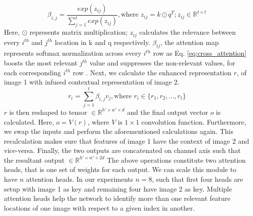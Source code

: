 \documentclass[a4paper,conference]{IEEEtran}
\begin{document}
\begin{equation}
    \beta_{i,j} = \frac{exp(z_{ij})}{\sum_{j=1}^{t} exp(z_{ij})}, \text{where } z_{ij} = k \odot q^{T}; z_{ij} \in \mathbb{R}^{t \times t}
    \label{eq:cross_attention}
\end{equation}
Here, $\odot$ represents matrix multiplication; $z_{ij}$ calculates the relevance between every $i^{th}$ and $j^{th}$ location in k and q respectively. $\beta_{ij}$, the attention map represents softmax normalization across every $i^{th}$ row as Eq. \ref{eq:cross_attention} boosts the most relevant $j^{th}$ value and suppresses the non-relevant values, for  each corresponding $i^{th}$ row .
Next, we calculate the enhanced representation $r$, of image 1 with infused contextual representation of image 2.
\begin{equation}
    r_{i} = \sum_{j=1}^{t} \beta_{i,j}v_{j}, \text{where } r_{i} \in \{r_{1}, r_{2}, \dots, r_{t}\}
    \label{eq:context_vector}
\end{equation}
$r$ is then reshaped to tensor $\in \mathbb{R}^{h' \times w' \times d}$ and the final output vector $o$ is calculated. Here, $o = V(r)$, where $V$ is $1 \times 1$ convolution function.
\newline \indent Furthermore, we swap the inputs and perform the aforementioned calculations again. This recalculation makes sure that features of image 1 have the context of image 2 and vice-versa. Finally, the two outputs are concatenated on channel axis such that the resultant output $\in \mathbb{R}^{h' \times w' \times 2d}$
\newline \indent The above operations constitute two attention heads, that is one set of weights for each output. We can scale this module to have $n$ attention heads. In our experiments $n=8$, such that first four heads are setup with image 1 as key and remaining four have image 2 as key. Multiple attention heads help the network to identify more than one relevant feature locations of one image with respect to a given index in another.
\end{document}
